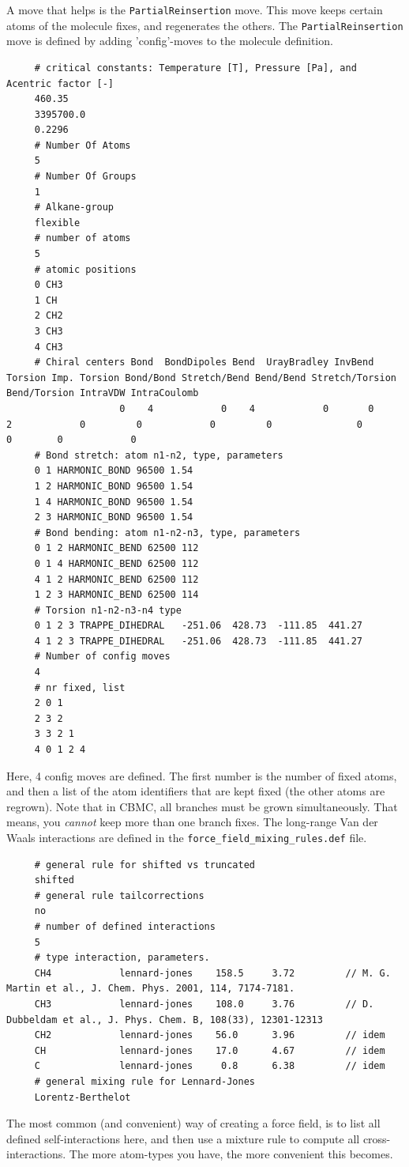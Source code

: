 A move that helps is the \verb+PartialReinsertion+ move. This move keeps certain atoms of the molecule fixes, and 
regenerates the others. The \verb+PartialReinsertion+ move is defined by adding 'config'-moves to the molecule definition.
\begin{tiny}
\begin{verbatim}
     # critical constants: Temperature [T], Pressure [Pa], and Acentric factor [-]
     460.35
     3395700.0
     0.2296
     # Number Of Atoms
     5
     # Number Of Groups
     1
     # Alkane-group
     flexible
     # number of atoms
     5
     # atomic positions
     0 CH3
     1 CH
     2 CH2
     3 CH3
     4 CH3
     # Chiral centers Bond  BondDipoles Bend  UrayBradley InvBend  Torsion Imp. Torsion Bond/Bond Stretch/Bend Bend/Bend Stretch/Torsion Bend/Torsion IntraVDW IntraCoulomb
                    0    4            0    4            0       0        2            0         0            0         0               0            0        0            0
     # Bond stretch: atom n1-n2, type, parameters
     0 1 HARMONIC_BOND 96500 1.54
     1 2 HARMONIC_BOND 96500 1.54
     1 4 HARMONIC_BOND 96500 1.54
     2 3 HARMONIC_BOND 96500 1.54
     # Bond bending: atom n1-n2-n3, type, parameters
     0 1 2 HARMONIC_BEND 62500 112
     0 1 4 HARMONIC_BEND 62500 112
     4 1 2 HARMONIC_BEND 62500 112
     1 2 3 HARMONIC_BEND 62500 114
     # Torsion n1-n2-n3-n4 type
     0 1 2 3 TRAPPE_DIHEDRAL   -251.06  428.73  -111.85  441.27
     4 1 2 3 TRAPPE_DIHEDRAL   -251.06  428.73  -111.85  441.27
     # Number of config moves
     4
     # nr fixed, list
     2 0 1
     2 3 2
     3 3 2 1
     4 0 1 2 4
\end{verbatim}
\end{tiny}
Here, 4 config moves are defined. The first number is the number of fixed atoms, and then a list of the atom identifiers that are kept fixed
(the other atoms are regrown). Note that in CBMC, all branches must be grown simultaneously. That means, you \emph{cannot} keep more than one branch fixes.
The long-range Van der Waals interactions are defined in the \verb+force_field_mixing_rules.def+ file.
\begin{tiny}
\begin{verbatim}
     # general rule for shifted vs truncated
     shifted
     # general rule tailcorrections
     no
     # number of defined interactions
     5
     # type interaction, parameters.
     CH4            lennard-jones    158.5     3.72         // M. G. Martin et al., J. Chem. Phys. 2001, 114, 7174-7181.
     CH3            lennard-jones    108.0     3.76         // D. Dubbeldam et al., J. Phys. Chem. B, 108(33), 12301-12313
     CH2            lennard-jones    56.0      3.96         // idem
     CH             lennard-jones    17.0      4.67         // idem
     C              lennard-jones     0.8      6.38         // idem
     # general mixing rule for Lennard-Jones
     Lorentz-Berthelot
\end{verbatim}
\end{tiny}
The most common (and convenient) way of creating a force field, is to list all defined self-interactions here, and then use a mixture rule to compute
all cross-interactions. The more atom-types you have, the more convenient this becomes.

